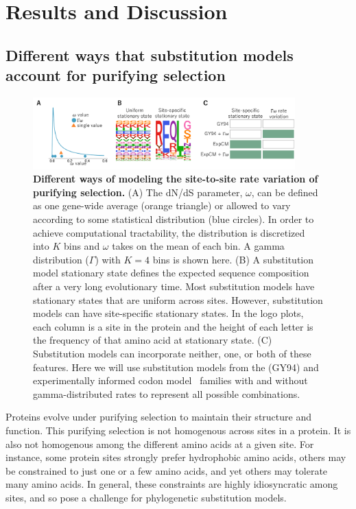 \documentclass[11pt]{article}
\begin{document}
\section*{Results and Discussion}

\subsection*{Different ways that substitution models account for purifying selection}

\begin{figure}
\centerline{\includegraphics[width=0.90\textwidth]{figures/model_feature.pdf}}
\caption{\label{fig:model_feature}
\textbf{Different ways of modeling the site-to-site rate variation of purifying selection.}
(A) The dN/dS parameter, $\omega$, can be defined as one gene-wide average (orange triangle) or allowed to vary according to some statistical distribution (blue circles). 
In order to achieve computational tractability, the distribution is discretized into $K$ bins and $\omega$ takes on the mean of each bin. 
A gamma distribution ($\Gamma$) with $K=4$ bins is shown here.
(B) A substitution model stationary state defines the expected sequence composition after a very long evolutionary time. 
Most substitution models have stationary states that are uniform across sites.
However, substitution models can have site-specific stationary states.
In the logo plots, each column is a site in the protein and the height of each letter is the frequency of that amino acid at stationary state. 
(C) Substitution models can incorporate neither, one, or both of these features.
Here we will use substitution models from the \citet{goldman1994codon} (GY94) and experimentally informed codon model~\citep[ExpCM;][]{hilton2017phydms} families with and without gamma-distributed rates to represent all possible combinations. 
}
\end{figure}

Proteins evolve under purifying selection to maintain their structure and function. 
This purifying selection is not homogenous across sites in a protein.
It is also not homogenous among the different amino acids at a given site.
For instance, some protein sites strongly prefer hydrophobic amino acids, others may be constrained to just one or a few amino acids, and yet others may tolerate many amino acids.
In general, these constraints are highly idiosyncratic among sites, and so pose a challenge for phylogenetic substitution models.
\end{document}
